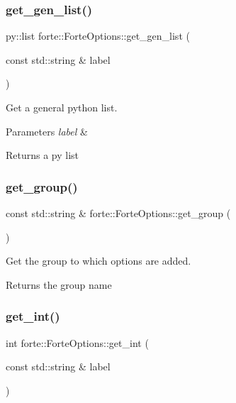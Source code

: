 \subsubsection{\texorpdfstring{get\+\_\+gen\+\_\+list()}{get\_gen\_list()}}
{\footnotesize\ttfamily py\+::list forte\+::\+Forte\+Options\+::get\+\_\+gen\+\_\+list (\begin{DoxyParamCaption}\item[{const std\+::string \&}]{label }\end{DoxyParamCaption})}



Get a general python list. 


\begin{DoxyParams}{Parameters}
{\em label} & \\
\hline
\end{DoxyParams}
\begin{DoxyReturn}{Returns}
a py list 
\end{DoxyReturn}
\mbox{\label{classforte_1_1_forte_options_a4fd3d46c0072331c9d7f1bf5782201ea}} 
\subsubsection{\texorpdfstring{get\+\_\+group()}{get\_group()}}
{\footnotesize\ttfamily const std\+::string \& forte\+::\+Forte\+Options\+::get\+\_\+group (\begin{DoxyParamCaption}{ }\end{DoxyParamCaption})}



Get the group to which options are added. 

\begin{DoxyReturn}{Returns}
the group name 
\end{DoxyReturn}
\mbox{\label{classforte_1_1_forte_options_afc7de0007819e021d3f7461535cda476}} 
\subsubsection{\texorpdfstring{get\+\_\+int()}{get\_int()}}
{\footnotesize\ttfamily int forte\+::\+Forte\+Options\+::get\+\_\+int (\begin{DoxyParamCaption}\item[{const std\+::string \&}]{label }\end{DoxyParamCaption})}



